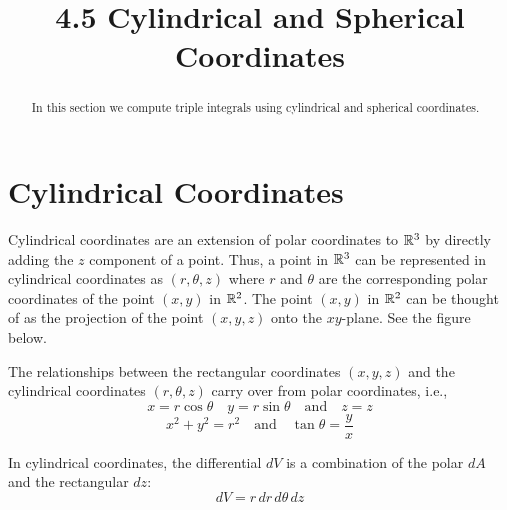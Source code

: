 \documentclass[handout]{ximera}
\title{4.5 Cylindrical and Spherical Coordinates}
\begin{document}
\begin{abstract}
In this section we compute triple integrals using cylindrical and spherical coordinates.
\end{abstract}
 
\maketitle

\section{Cylindrical Coordinates}
Cylindrical coordinates are an extension of polar coordinates to $\mathbb R^3$ by directly adding the $z$ component of a point.
Thus, a point in $\mathbb R^3$ can be represented in cylindrical coordinates as $(r, \theta, z)$ 
where $r$ and $\theta$ are the corresponding polar coordinates of the point 
$(x,y)$ in $\mathbb R^2$.  The point $(x,y)$ in $\mathbb R^2$ can be thought of as the projection of the point $(x,y,z)$ onto the $xy$-plane.
See the figure below.

\begin{image}
\end{image}


The relationships between the rectangular coordinates $(x,y,z)$ and the cylindrical coordinates $(r, \theta, z)$ carry over from 
polar coordinates, i.e.,
\[
x = r\cos \theta \quad y = r\sin\theta \quad \text{and} \quad z = z
\]
\[
x^2 + y^2 = r^2 \quad \text{and} \quad \tan \theta = \frac{y}{x}
\]

In cylindrical coordinates, the differential $dV$ is a combination of the polar $dA$ and the rectangular $dz$:
\[
dV = r \, dr \, d\theta \, dz
\]
\end{document}
